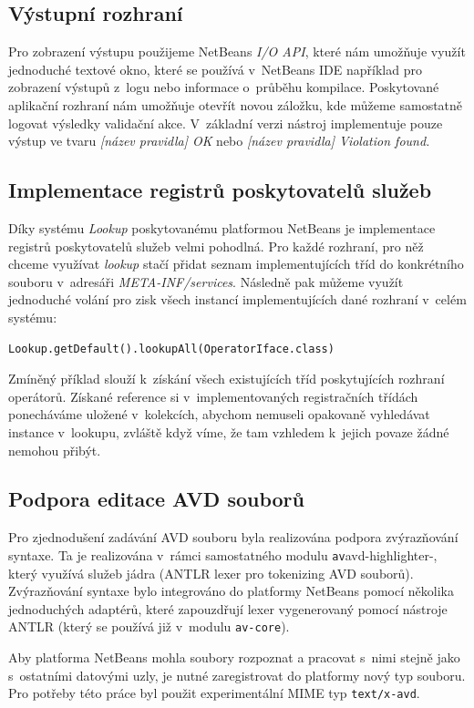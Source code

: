\subsection{Výstupní rozhraní}
Pro zobrazení výstupu použijeme NetBeans \emph{I/O API}, které nám umožňuje využít jednoduché textové okno, které se používá v~NetBeans IDE například pro zobrazení výstupů z~logu nebo informace o~průběhu kompilace. Poskytované aplikační rozhraní nám umožňuje otevřít novou záložku, kde můžeme samostatně logovat výsledky validační akce. V~základní verzi nástroj implementuje pouze výstup ve tvaru \emph{[název pravidla] OK} nebo \emph{[název pravidla] Violation found.}

\subsection{Implementace registrů poskytovatelů služeb}
Díky systému \emph{Lookup} poskytovanému platformou NetBeans je implementace registrů poskytovatelů služeb velmi pohodlná. Pro každé rozhraní, pro něž chceme využívat \emph{lookup} stačí přidat seznam implementujících tříd do konkrétního souboru v~adresáři \emph{META-INF/services}. Následně pak můžeme využít jednoduché volání pro zisk všech instancí implementujících dané rozhraní v~celém systému:

\begin{verbatim}
Lookup.getDefault().lookupAll(OperatorIface.class)
\end{verbatim}

Zmíněný příklad slouží k~získání všech existujících tříd poskytujících rozhraní operátorů. Získané reference si v~implementovaných registračních třídách ponecháváme uložené v~kolekcích, abychom nemuseli opakovaně vyhledávat instance v~lookupu, zvláště když víme, že tam vzhledem k~jejich povaze žádné nemohou přibýt.

\subsection{Podpora editace AVD souborů}
Pro zjednodušení zadávání AVD souboru byla realizována podpora zvýrazňování syntaxe. Ta je realizována v~rámci samostatného modulu \verb-av-avd-highlighter-, který využívá služeb jádra (ANTLR lexer pro tokenizing AVD souborů). Zvýrazňování syntaxe bylo integrováno do platformy NetBeans pomocí několika jednoduchých adaptérů, které zapouzdřují lexer vygenerovaný pomocí nástroje ANTLR (který se používá již v~modulu \verb+av-core+).

Aby platforma NetBeans mohla soubory rozpoznat a pracovat s~nimi stejně jako s~ostatními datovými uzly, je nutné zaregistrovat do platformy nový typ souboru. Pro potřeby této práce byl použit experimentální MIME typ \verb+text/x-avd+.
